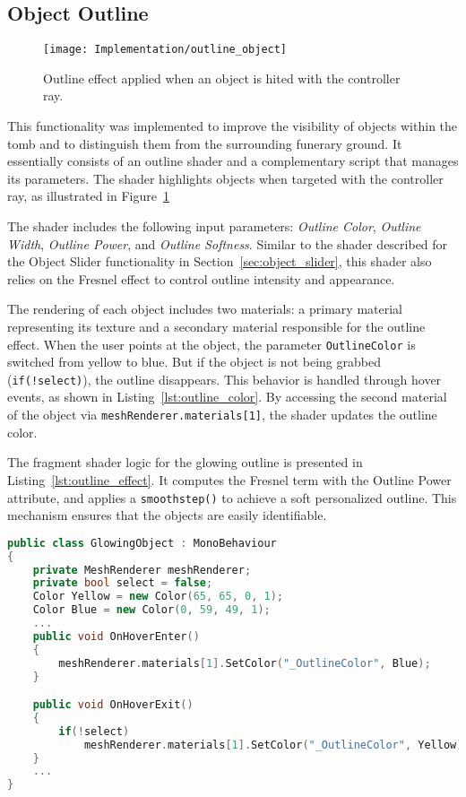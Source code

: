 \subsection*{Object Outline}
\label{sec:object_outline}

 \begin{figure}[h!]
    \centering
    \texttt{[image: Implementation/outline\_object]}
    \caption{Outline effect applied when an object is hited with the controller ray.}
    \label{fig:outline_object}    
\end{figure}


This functionality was implemented to improve the visibility of objects within the tomb and to distinguish them from the surrounding funerary ground.  
It essentially consists of an outline shader and a complementary script that manages its parameters. 
The shader highlights objects when targeted with the controller ray, as illustrated in Figure~\ref{fig:outline_object}

The shader includes the following input parameters: \emph{Outline Color}, \emph{Outline Width}, \emph{Outline Power}, and \emph{Outline Softness}.  
Similar to the shader described for the Object Slider functionality in Section~\ref{sec:object_slider}, this shader also relies on the Fresnel effect to control outline intensity and appearance.  

The rendering of each object includes two materials: a primary material representing its texture and a secondary material responsible for the outline effect.
When the user points at the object, the parameter \texttt{OutlineColor} is switched from yellow to blue. But if the object is not being grabbed (\texttt{if(!select)}), the outline disappears. 
This behavior is handled through hover events, as shown in Listing~\ref{lst:outline_color}. 
By accessing the second material of the object via \texttt{meshRenderer.materials[1]}, the shader updates the outline color.  

The fragment shader logic for the glowing outline is presented in Listing~\ref{lst:outline_effect}. 
It computes the Fresnel term with the Outline Power attribute, and applies a \texttt{smoothstep()} to achieve a soft personalized outline.  
This mechanism ensures that the objects are easily identifiable. 


\begin{lstlisting}[language=C++, caption={Partial class with Outline Color changed when the object is Hovered.}, label={lst:outline_color}]
    public class GlowingObject : MonoBehaviour
{
    private MeshRenderer meshRenderer;
    private bool select = false;
    Color Yellow = new Color(65, 65, 0, 1);
    Color Blue = new Color(0, 59, 49, 1);
    ...
    public void OnHoverEnter()
    {
        meshRenderer.materials[1].SetColor("_OutlineColor", Blue);
    }

    public void OnHoverExit()
    {
        if(!select)
            meshRenderer.materials[1].SetColor("_OutlineColor", Yellow);
    }
    ...
}
\end{lstlisting}


